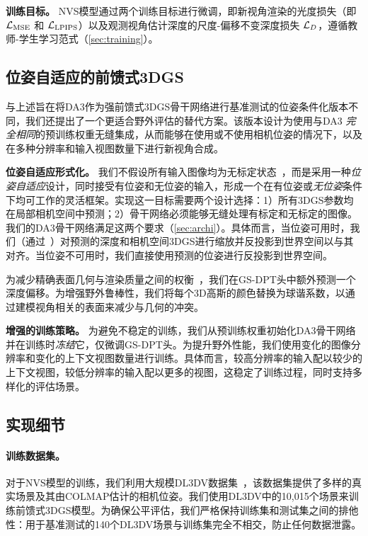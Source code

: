 \textbf{训练目标。}
NVS模型通过两个训练目标进行微调，即新视角渲染的光度损失（即 $\mathcal{L}_\mathrm{MSE}$ 和 $\mathcal{L}_\mathrm{LPIPS}$）以及观测视角估计深度的尺度-偏移不变深度损失 $\mathcal{L}_{D}$，遵循教师-学生学习范式（\cref{sec:training}）。



\subsection{位姿自适应的前馈式3DGS}

与上述旨在将DA3作为强前馈式3DGS骨干网络进行基准测试的位姿条件化版本不同，我们还提出了一个更适合野外评估的替代方案。该版本设计为使用与DA3 \textit{完全相同}的预训练权重无缝集成，从而能够在使用或不使用相机位姿的情况下，以及在多种分辨率和输入视图数量下进行新视角合成。

\textbf{位姿自适应形式化。} 我们不假设所有输入图像均为无标定状态~\cite{smart2024splatt3r,ye2024no,flare,jiang2025anysplat}，而是采用一种\textit{位姿自适应}设计，同时接受有位姿和无位姿的输入，形成一个在有位姿或\textit{无位姿}条件下均可工作的灵活框架。实现这一目标需要两个设计选择：1）所有3DGS参数均在局部相机空间中预测；2）骨干网络必须能够无缝处理有标定和无标定的图像。我们的DA3骨干网络满足这两个要求（\cref{sec:archi}）。具体而言，当位姿可用时，我们（通过~\cite{umeyama2002least}）对预测的深度和相机空间3DGS进行缩放并反投影到世界空间以与其对齐。当位姿不可用时，我们直接使用预测的位姿进行反投影到世界空间。

为减少精确表面几何与渲染质量之间的权衡~\cite{guedon2024sugar}，我们在GS-DPT头中额外预测一个深度偏移。为增强野外鲁棒性，我们将每个3D高斯的颜色替换为球谐系数，以通过建模视角相关的表面来减少与几何的冲突。

\textbf{增强的训练策略。} 为避免不稳定的训练，我们从预训练权重初始化DA3骨干网络并在训练时\textit{冻结}它，仅微调GS-DPT头。为提升野外性能，我们使用变化的图像分辨率和变化的上下文视图数量进行训练。具体而言，较高分辨率的输入配以较少的上下文视图，较低分辨率的输入配以更多的视图，这稳定了训练过程，同时支持多样化的评估场景。

\subsection{实现细节}

\paragraph{训练数据集。}
对于NVS模型的训练，我们利用大规模DL3DV数据集~\citep{ling2024dl3dv}，该数据集提供了多样的真实场景及其由COLMAP估计的相机位姿。我们使用DL3DV中的10,015个场景来训练前馈式3DGS模型。为确保公平评估，我们严格保持训练集和测试集之间的排他性：用于基准测试的140个DL3DV场景与训练集完全不相交，防止任何数据泄露。



